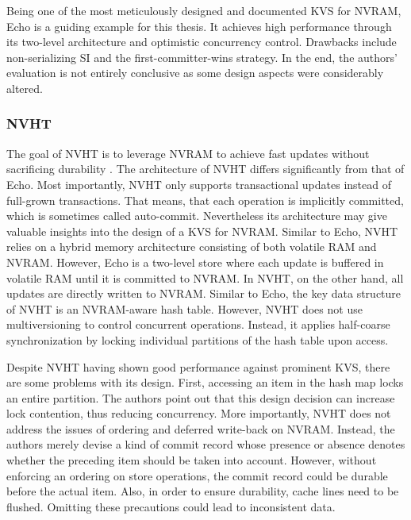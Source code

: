 Being one of the most meticulously designed and documented \ac{KVS} for
\ac{NVRAM}, Echo is a guiding example for this thesis. It achieves high
performance through its two-level architecture and optimistic concurrency
control. Drawbacks include non-serializing \ac{SI} and the first-committer-wins
strategy. In the end, the authors' evaluation is not entirely conclusive as some
design aspects were considerably altered.

\subsubsection{NVHT}

The goal of NVHT is to leverage \ac{NVRAM} to achieve fast updates without
sacrificing durability \cite{zhou2016nvht}. The architecture of NVHT differs
significantly from that of Echo. Most importantly, NVHT only supports
transactional updates instead of full-grown transactions. That means, that each
operation is implicitly committed, which is sometimes called auto-commit.
Nevertheless its architecture may give valuable insights into the design of a
\ac{KVS} for \ac{NVRAM}. Similar to Echo, NVHT relies on a hybrid memory
architecture consisting of both volatile \ac{RAM} and \ac{NVRAM}. However, Echo
is a two-level store where each update is buffered in volatile \ac{RAM} until it
is committed to \ac{NVRAM}. In NVHT, on the other hand, all updates are directly
written to \ac{NVRAM}. Similar to Echo, the key data structure of NVHT is an
\ac{NVRAM}-aware hash table. However, NVHT does not use multiversioning to
control concurrent operations. Instead, it applies half-coarse synchronization
by locking individual partitions of the hash table upon access.

Despite NVHT having shown good performance against prominent \ac{KVS}, there are
some problems with its design. First, accessing an item in the hash map locks an
entire partition. The authors point out that this design decision can increase
lock contention, thus reducing concurrency. More importantly, NVHT does not
address the issues of ordering and deferred write-back on \ac{NVRAM}. Instead,
the authors merely devise a kind of commit record whose presence or absence
denotes whether the preceding item should be taken into account. However,
without enforcing an ordering on store operations, the commit record could be
durable before the actual item. Also, in order to ensure durability, cache lines
need to be flushed. Omitting these precautions could lead to inconsistent data.

